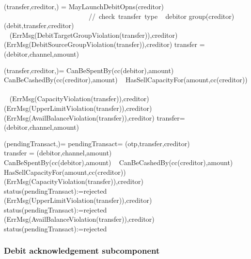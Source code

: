   \begin{asm}
 (transfer,creditor,)  =\+
 \IF MayLaunchDebitOpns(creditor) 
 \mbox{~~~~~~~~~~~~~~~~~~~~~~~~  // check transfer type}\+
 \THEN ~ \IF debitor \in group(creditor) \+
 \THEN  ~ (debit,transfer,creditor) \\
 \ELSE ~ 
 (ErrMsg(DebitTargetGroupViolation(transfer)),\TO creditor) \- 
 \ELSE ~ 
 (ErrMsg(DebitSourceGroupViolation(transfer)),\TO creditor)\-
 \WHERE \+
 transfer = (debitor,channel,amount) 
 \end{asm}
 
 \begin{asm}
 (transfer,creditor,)=\+
 \IF CanBeSpentBy(cc(debitor),amount) \+
 \THEN ~ \IF CanBeCashedBy(cc(creditor),amount) \+
 \THEN ~ \IF HasSellCapacityFor(amount,cc(creditor)) \+
 \THEN ~ \\
 \ELSE 
 ~ (ErrMsg(CapacityViolation(transfer)),\TO creditor)\-
 \ELSE 
 ~ (ErrMsg(UpperLimitViolation(transfer)),\TO creditor)\-
 \ELSE 
 ~ (ErrMsg(AvailBalanceViolation(transfer)),\TO creditor)\dec\-
 \WHERE \+
 transfer=(debitor,channel,amount)
 \end{asm}
 
  
 \begin{asm}
 (pendingTransact,)=\+
 \LET pendingTransact= (otp,transfer,creditor)\\
 \LET transfer = (debitor,channel,amount)\\
 \IF CanBeSpentBy(cc(debitor),amount) \+
 \THEN ~ \IF CanBeCashedBy(cc(creditor),amount) \+
 \THEN ~ \IF HasSellCapacityFor(amount,cc(creditor)) \+
 \THEN ~  \\
 \ELSE \+
 (ErrMsg(CapacityViolation(transfer)),\TO creditor)\\
 status(pendingTransact):=rejected \dec\-
 \ELSE \+
 (ErrMsg(UpperLimitViolation(transfer)),\TO creditor)\\
 status(pendingTransact):=rejected \dec\-
 \ELSE \+
 (ErrMsg(AvailBalanceViolation(transfer)),\TO creditor)\\
 status(pendingTransact):=rejected
 \end{asm}
 
 \subsubsection{Debit acknowledgement subcomponent}
 
